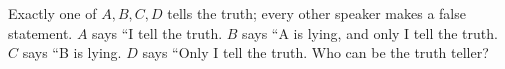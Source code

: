 Exactly one of $A,B,C,D$ tells the truth; every other speaker makes a false statement. $A$ says ``I tell the truth. $B$ says ``A is lying, and only I tell the truth. $C$ says ``B is lying. $D$ says ``Only I tell the truth. Who can be the truth teller?
